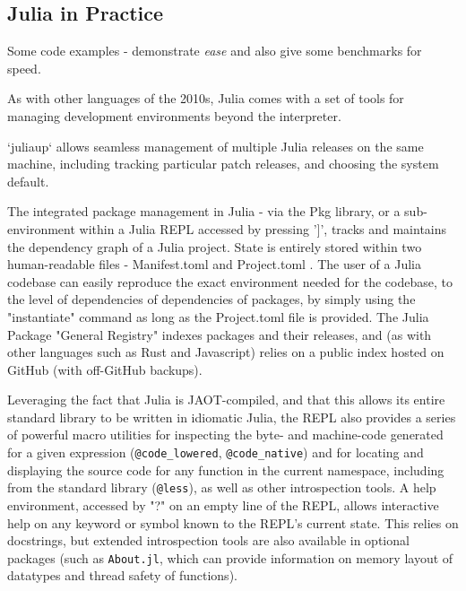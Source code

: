 \documentclass{webofc}
\begin{document}


\subsection{Julia in Practice}

Some code examples - demonstrate \emph{ease} and also give some benchmarks for
speed.



As with other languages of the 2010s, Julia comes with a set of tools for managing development environments beyond the interpreter.

`juliaup` allows seamless management of multiple Julia releases on the same machine, including tracking particular patch releases, and 
choosing the system default.

The integrated package management in Julia - via the Pkg library, or a sub-environment within a Julia REPL accessed by pressing '$]$', 
tracks and maintains the dependency graph of a Julia project. State is entirely stored within two human-readable files - Manifest.toml and Project.toml
. The user of a Julia codebase can easily reproduce the exact environment needed for the codebase, to the level of dependencies of 
dependencies of packages, by simply using the "instantiate" command as long as the Project.toml file is provided.
The Julia Package "General Registry" indexes packages and their releases, and (as with other languages such as Rust and Javascript) relies on a public
index hosted on GitHub (with off-GitHub backups).

Leveraging the fact that Julia is JAOT-compiled, and that this allows its entire standard library to be written in idiomatic Julia, the REPL also provides
a series of powerful macro utilities for inspecting the byte- and machine-code generated for a given expression (\verb$@code_lowered$, \verb$@code_native$) and
for locating and displaying the source code for any function in the current namespace, including from the standard library (\verb$@less$), as well as other introspection
tools.
A help environment, accessed by "?" on an empty line of the REPL, allows interactive help on any keyword or symbol known to the REPL's current state. This relies 
on docstrings, but extended introspection tools are also available in optional packages (such as \texttt{About.jl}, which can provide information 
on memory layout of datatypes and thread safety of functions).
\end{document}
